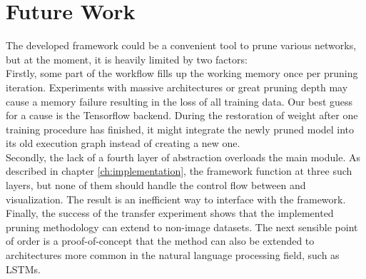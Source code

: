 \section{Future Work}
The developed framework could be a convenient tool to prune various networks, but at the moment, it is heavily limited by two factors:
\\
Firstly, some part of the workflow fills up the working memory once per pruning iteration. Experiments with massive architectures or great pruning depth may cause a memory failure resulting in the loss of all training data. Our best guess for a cause is the Tensorflow backend. During the restoration of weight after one training procedure has finished, it might integrate the newly pruned model into its old execution graph instead of creating a new one.
\\
Secondly, the lack of a fourth layer of abstraction overloads the main module. As described in chapter \ref{ch:implementation}, the framework function at three such layers, but none of them should handle the control flow between and visualization. The result is an inefficient way to interface with the framework.
\\
Finally, the success of the transfer experiment shows that the implemented pruning methodology can extend to non-image datasets. The next sensible point of order is a proof-of-concept that the method can also be extended to architectures more common in the natural language processing field, such as LSTMs.

